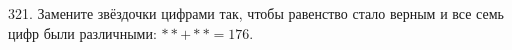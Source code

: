 321. Замените звёздочки цифрами так, чтобы равенство стало верным и все семь цифр были различными: $**+**=176.$\\
